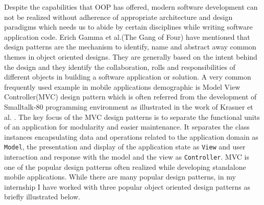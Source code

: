 \par Despite the capabilities that OOP has offered, modern software development can not be realized without adherence of appropriate architecture and design paradigms which needs us to abide by certain disciplines while writing software application code. Erich Gamma et al.(The Gang of Four) \cite{gamma1995design}  have mentioned that design patterns are the mechanism to identify, name and abstract away common themes in object oriented designs. They are generally based on the intent behind the design and they identify the collaboration, rolls and responsibilities of different objects in building a software application or solution. A very common frequently used example in mobile applications demographic is Model View Controller(MVC) design pattern which is often referred from the development of  Smalltalk-80 programming environment as illustrated in the work of Krasner et al. \cite{krasner1988description}. The key focus of the MVC design patterns is to separate the functional units of an application for modularity and easier maintenance. It separates the class instances encapsulating data and operations related to the application domain as \texttt{Model}, the presentation and display of the application state as \texttt{View} and user interaction and response with the model and the view as \texttt{Controller}. MVC is one of the popular design patterns often realized while developing standalone mobile applications. While there are many popular design patterns, in my internship I have worked with three popular object oriented design patterns as briefly illustrated below.
